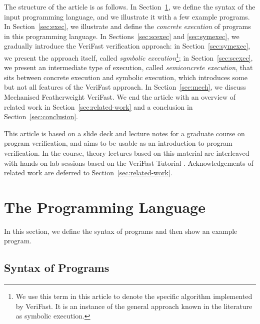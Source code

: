 \documentclass{CSML}
\theoremstyle{definition}\newtheorem{notation}[thm]{Notation}
\theoremstyle{plain}\newtheorem{satz}[thm]{Satz}
\begin{document}
The structure of the article is as follows. In 
Section~\ref{sec:language}, we define the syntax of the 
input programming language, 
and we illustrate it with a few example programs. In 
Section~\ref{sec:exec}, we illustrate and define the 
\emph{concrete execution} of programs in this programming 
language. In Sections~\ref{sec:scexec} and \ref{sec:symexec}, 
we gradually introduce the VeriFast verification approach: in 
Section~\ref{sec:symexec}, we present the approach itself, 
called \emph{symbolic execution}\footnote{We use this term in this article to denote the specific algorithm implemented by VeriFast. It is an instance of the general approach known in the literature as symbolic execution.}; in Section~\ref{sec:scexec}, 
we present an intermediate type of execution, called \emph{semiconcrete execution}, that sits between 
concrete execution and symbolic execution, which introduces 
some but not all features of the VeriFast approach.
In Section~\ref{sec:mech}, we discuss Mechanised Featherweight VeriFast. We end the article
with an overview of related work in Section~\ref{sec:related-work} and
a conclusion in Section~\ref{sec:conclusion}.

This article is based on a slide deck and lecture notes for a graduate 
course on program verification, and aims to be usable as an introduction 
to program verification. In the course, theory lectures based on this 
material are interleaved with hands-on lab sessions based on the VeriFast 
Tutorial \cite{vftutorial}. Acknowledgements of related work are deferred 
to Section~\ref{sec:related-work}.

\section{The Programming Language}\label{sec:language}

In this section, we define the syntax of programs and then show an example program.

\subsection{Syntax of Programs}
\end{document}
